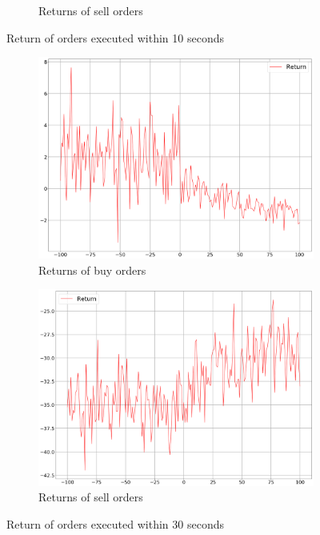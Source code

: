 \begin{figure}[H]
\begin{subfigure}[b]{0.45\textwidth}
        \caption{Returns of sell orders}
        \label{fig:behvaiour-10s-sell}
    \end{subfigure}
    \caption{Return of orders executed within 10 seconds}
\end{figure}

\begin{figure}[H]
    \centering
    \begin{subfigure}[b]{0.45\textwidth}
        \includegraphics[width=\textwidth]{images/behaviour-30s-buy.png}
        \caption{Returns of buy orders}
        \label{fig:behvaiour-30s-buy}
    \end{subfigure}
    \begin{subfigure}[b]{0.45\textwidth}
        \includegraphics[width=\textwidth]{images/behaviour-30s-sell.png}
        \caption{Returns of sell orders}
        \label{fig:behvaiour-30s-sell}
    \end{subfigure}
    \caption{Return of orders executed within 30 seconds}
\end{figure}


